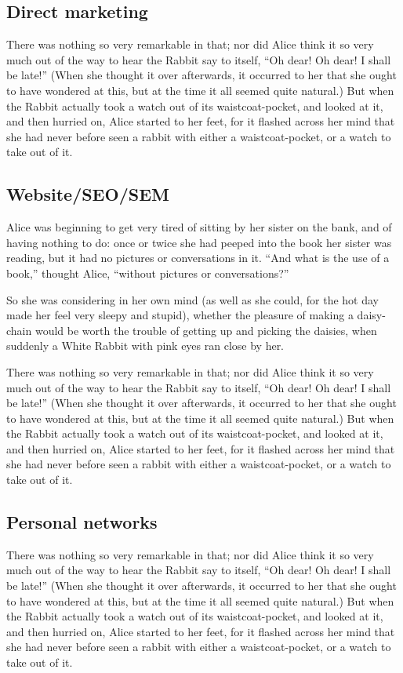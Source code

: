 \documentclass[12pt]{article}
\begin{document}
\subsection{Direct marketing}
\label{sec-4-1}
There was nothing so very remarkable in that; nor did Alice think it so very much out of the way to hear the Rabbit say to itself, ``Oh dear! Oh dear! I shall be late!'' (When she thought it over afterwards, it occurred to her that she ought to have wondered at this, but at the time it all seemed quite natural.) But when the Rabbit actually took a watch out of its waistcoat-pocket, and looked at it, and then hurried on, Alice started to her feet, for it flashed across her mind that she had never before seen a rabbit with either a waistcoat-pocket, or a watch to take out of it. 

\subsection{Website/SEO/SEM}
\label{sec-4-2}
Alice was beginning to get very tired of sitting by her sister on the bank, and of having nothing to do: once or twice she had peeped into the book her sister was reading, but it had no pictures or conversations in it. ``And what is the use of a book,'' thought Alice, ``without pictures or conversations?'' 

So she was considering in her own mind (as well as she could, for the hot day made her feel very sleepy and stupid), whether the pleasure of making a daisy-chain would be worth the trouble of getting up and picking the daisies, when suddenly a White Rabbit with pink eyes ran close by her.

There was nothing so very remarkable in that; nor did Alice think it so very much out of the way to hear the Rabbit say to itself, ``Oh dear! Oh dear! I shall be late!'' (When she thought it over afterwards, it occurred to her that she ought to have wondered at this, but at the time it all seemed quite natural.) But when the Rabbit actually took a watch out of its waistcoat-pocket, and looked at it, and then hurried on, Alice started to her feet, for it flashed across her mind that she had never before seen a rabbit with either a waistcoat-pocket, or a watch to take out of it. 

\subsection{Personal networks}
\label{sec-4-3}
There was nothing so very remarkable in that; nor did Alice think it so very much out of the way to hear the Rabbit say to itself, ``Oh dear! Oh dear! I shall be late!'' (When she thought it over afterwards, it occurred to her that she ought to have wondered at this, but at the time it all seemed quite natural.) But when the Rabbit actually took a watch out of its waistcoat-pocket, and looked at it, and then hurried on, Alice started to her feet, for it flashed across her mind that she had never before seen a rabbit with either a waistcoat-pocket, or a watch to take out of it. 
\end{document}
